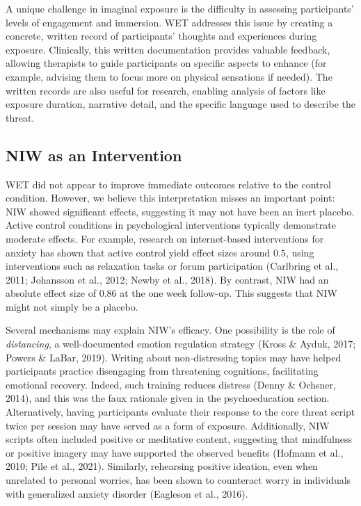 \documentclass[
  man,floatsintext]{apa7}
\begin{document}
A unique challenge in imaginal exposure is the difficulty in assessing participants' levels of engagement and immersion.
WET addresses this issue by creating a concrete, written record of participants' thoughts and experiences during exposure.
Clinically, this written documentation provides valuable feedback, allowing therapists to guide participants on specific aspects to enhance (for example, advising them to focus more on physical sensations if needed).
The written records are also useful for research, enabling analysis of factors like exposure duration, narrative detail, and the specific language used to describe the threat.

\subsection{NIW as an Intervention}\label{niw-as-an-intervention}

WET did not appear to improve immediate outcomes relative to the control condition.
However, we believe this interpretation misses an important point: NIW showed significant effects, suggesting it may not have been an inert placebo.
Active control conditions in psychological interventions typically demonstrate moderate effects.
For example, research on internet-based interventions for anxiety has shown that active control yield effect sizes around \(0.5\), using interventions such as relaxation tasks or forum participation (Carlbring et al., 2011; Johansson et al., 2012; Newby et al., 2018).
By contrast, NIW had an absolute effect size of \(0.86\) at the one week follow-up.
This suggests that NIW might not simply be a placebo.

Several mechanisms may explain NIW's efficacy.
One possibility is the role of \emph{distancing}, a well-documented emotion regulation strategy (Kross \& Ayduk, 2017; Powers \& LaBar, 2019).
Writing about non-distressing topics may have helped participants practice disengaging from threatening cognitions, facilitating emotional recovery.
Indeed, such training reduces distress (Denny \& Ochsner, 2014), and this was the faux rationale given in the psychoeducation section.
Alternatively, having participants evaluate their response to the core threat script twice per session may have served as a form of exposure.
Additionally, NIW scripts often included positive or meditative content, suggesting that mindfulness or positive imagery may have supported the observed benefits (Hofmann et al., 2010; Pile et al., 2021).
Similarly, rehearsing positive ideation, even when unrelated to personal worries, has been shown to counteract worry in individuals with generalized anxiety disorder (Eagleson et al., 2016).
\end{document}
